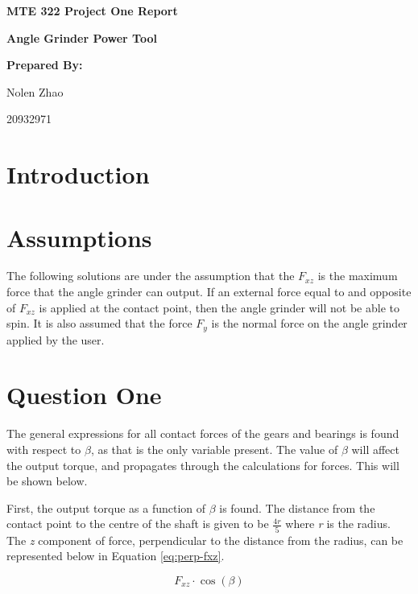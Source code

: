 \documentclass[12pt]{article}
\begin{document}
\raggedright
    \begin{titlepage}
        \centering
        \huge{\textbf{MTE 322 Project One Report}}

        \vspace{15mm}
        \Large{\textbf{Angle Grinder Power Tool}}

        \vspace{15mm}
        \Large{\textbf{Prepared By:}}
        
        \Large{Nolen Zhao}

        \Large{20932971}

    \end{titlepage}

    \section{Introduction}

    \section{Assumptions}
        The following solutions are under the assumption that the $F_{xz}$ is the maximum force that the angle grinder 
        can output. If an external force equal to and opposite of $F_{xz}$ is applied at the contact point, 
        then the angle grinder will not be able to spin. It is also assumed that the force $F_{y}$ is the normal 
        force on the angle grinder applied by the user.
    
    \section{Question One}
        The general expressions for all contact forces of the gears and bearings is found with respect to $\beta$, as 
        that is the only variable present. The value of $\beta$ will affect the output torque, and propagates through the calculations 
        for forces. This will be shown below. 
        \bigskip

        First, the output torque as a function of $\beta$ is found. The distance from the contact point to the centre of the 
        shaft is given to be $\frac{4r}{5}$ where \emph{r} is the radius. The \emph{z} component of force, perpendicular to 
        the distance from the radius, can be represented below in Equation \ref{eq:perp-fxz}. 

        \begin{equation}
            F_{xz} \cdot \cos(\beta)
        \label{eq:perp-fxz}
        \end{equation}
\end{document}
